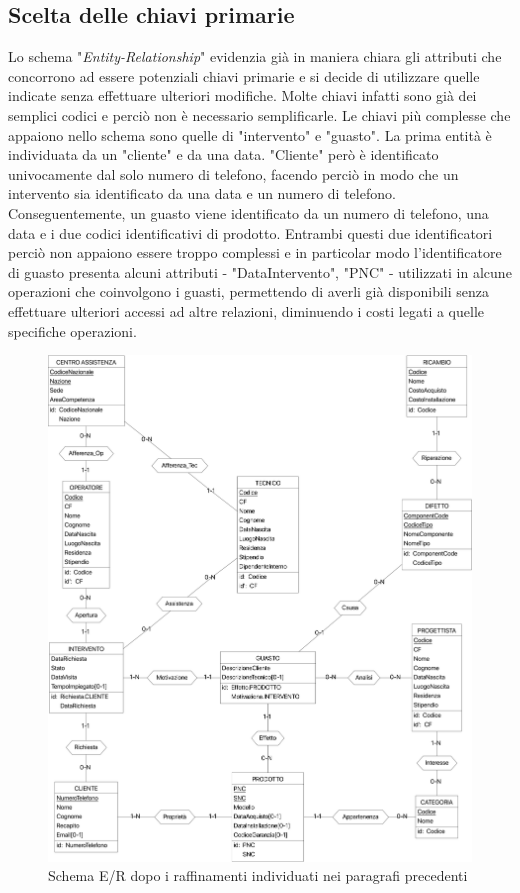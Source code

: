 \documentclass[a4paper, 12pt]{report}
\begin{document}
\subsection{Scelta delle chiavi primarie}

Lo schema "\textit{Entity-Relationship}" evidenzia già in maniera chiara gli attributi che concorrono ad essere potenziali chiavi primarie e si decide di utilizzare quelle
indicate senza effettuare ulteriori modifiche. Molte chiavi infatti sono già dei semplici codici e perciò non è necessario semplificarle. Le chiavi più complesse che appaiono nello
schema sono quelle di "intervento" e "guasto". La prima entità è individuata da un "cliente" e da una data. "Cliente" però è identificato univocamente dal solo numero di telefono,
facendo perciò in modo che un intervento sia identificato da una data e un numero di telefono. Conseguentemente, un guasto viene identificato da un numero di telefono, una data e i
due codici identificativi di prodotto. Entrambi questi due identificatori perciò non appaiono essere troppo complessi e in particolar modo l'identificatore di guasto presenta alcuni
attributi - "DataIntervento", "PNC" - utilizzati in alcune operazioni che coinvolgono i guasti, permettendo di averli già disponibili senza effettuare ulteriori accessi ad altre relazioni,
diminuendo i costi legati a quelle specifiche operazioni.

\begin{figure}[H]
	\centering
	\includegraphics[width=\linewidth]{images/refined.png}
	\caption{Schema E/R dopo i raffinamenti individuati nei paragrafi precedenti}
\end{figure}
\end{document}
